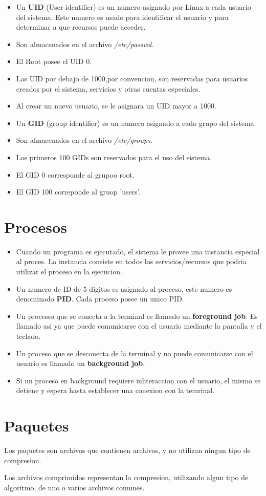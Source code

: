 \documentclass[11pt]{article}
\begin{document}
\begin{itemize}
    \item Un \textbf{UID} (User identifier) es un numero asignado por Linux a cada usuario del sistema. Este numero es usado para identificar el usuario y para determinar a que recursos puede acceder.
    \item Son almacenados en el archivo \textit{/etc/passwd}.
    \item El Root posee el UID 0.
    \item Las UID por debajo de 1000,por convencion, son reservadas para usuarios creados por el sistema, servicios y otras cuentas especiales.
    \item Al crear un nuevo usuario, se le asignara un UID mayor a 1000.
    \item Un \textbf{GID} (group identifier) es un numero asignado a cada grupo del sistema.
    \item Son almacenados en el archivo \textit{/etc/groups}.
    \item Los primeros 100 GIDs son reservados para el uso del sistema.
    \item El GID 0 corresponde al grupoo root.
    \item El GID 100 correponde al gruop 'users'.
\end{itemize}

\section{Procesos}
\begin{itemize}
\item Cuando un programa es ejecutado, el sistema le provee una instancia especial al proces. La instancia consiste en todos los servicios/recursos que podria utilizar el proceso en la ejecucion.
\item Un numero de ID de 5 digitos es asignado al proceso, este numero es denominado \textbf{PID}. Cada proceso posee un unico PID.
\item Un processo que se conecta a la terminal es llamado un \textbf{foreground job}. Es llamado asi ya que puede comunicarse con el usuario mediante la pantalla y el teclado.
\item Un proceso que se desconecta de la terminal y no puede comunicarse con el usuario es llamado un \textbf{background job}.
\item Si un proceso en background requiere inhteraccion con el usuario, el mismo se detiene y espera hasta establecer una conexion con la temrinal.
\end{itemize}

\section{Paquetes}
\item Los paquetes son archivos que contienen archivos, y no utilizan ningun tipo de compresion.
\item Los archivos comprimidos representan la compresion, utilizando algun tipo de algoritmo, de uno o varios archivos comunes.
\item 
\end{document}
